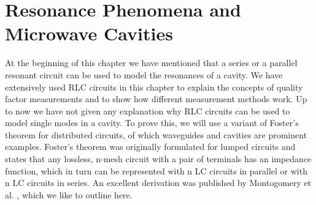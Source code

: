 \section{Resonance Phenomena and Microwave Cavities}
At the beginning of this chapter we have mentioned that a series or a parallel resonant circuit can be used to model the resonances of a cavity. We have extensively used RLC circuits in this chapter to explain the concepts of quality factor measurements and to show how different measurement methods work. Up to now we have not given any explanation why RLC circuits can be used to model single modes in a cavity. To prove this, we will use a variant of Foster's theorem for distributed circuits, of which waveguides and cavities are prominent examples. Foster's theorem was originally formulated for lumped circuits and states that any lossless, n-mesh circuit with a pair of terminals has an impedance function, which in turn can be represented with n LC circuits in parallel or with n LC circuits in series. An excellent derivation was published by Montogomery et al. \cite{mdp}, which we like to outline here.

